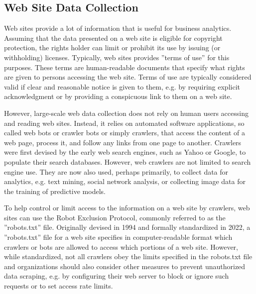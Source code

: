 \begin{withcode}
\section{Web Site Data Collection}

Web sites provide a lot of information that is useful for business analytics. Assuming that the data presented on a web site is eligible for copyright protection, the rights holder can limit or prohibit its use by issuing (or withholding) licenses. Typically, web sites provides ''terms of use'' for this purposes. These terms are human-readable documents that specify what rights are given to persons accessing the web site. Terms of use are typically considered valid if clear and reasonable notice is given to them, e.g. by requiring explicit acknowledgment or by providing a conspicuous link to them on a web site. 

However, large-scale web data collection does not rely on human users accessing and reading web sites. Instead, it relies on automated software applications, so called web bots or crawler bots or simply crawlers, that access the content of a web page, process it, and follow any links from one page to another. Crawlers were first devised by the early web search engines, such as Yahoo or Google, to populate their search databases. However, web crawlers are not limited to search engine use. They are now also used, perhaps primarily, to collect data for analytics, e.g. text mining, social network analysis, or collecting image data for the training of predictive models. 

To help control or limit access to the information on a web site by crawlers, web sites can use the Robot Exclusion Protocol, commonly referred to as the ''robots.txt'' file. Originally devised in 1994 and formally standardized in 2022, a ''robots.txt'' file for a web site specifies in computer-readable format which crawlers or bots are allowed to access which portions of a web site. However, while standardized, not all crawlers obey the limits specified in the robots.txt file and organizations should also consider other measures to prevent unauthorized data scraping, e.g. by configuring their web server to block or ignore such requests or to set access rate limits. 


\end{withcode}
